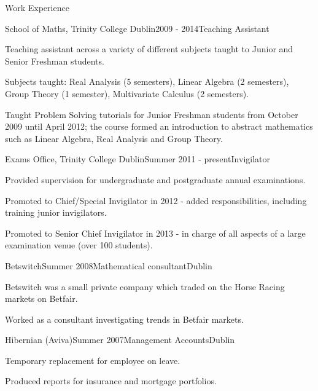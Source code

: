 \documentclass{resume} %
\begin{document}
\begin{rSection}{Work Experience}
\begin{rSubsection}{School of Maths, Trinity College Dublin}{2009 - 2014}{Teaching Assistant}{}
\item Teaching assistant across a variety of different subjects taught to Junior and Senior Freshman students.
\item Subjects taught: Real Analysis (5 semesters), Linear Algebra (2 semesters), Group Theory (1 semester), Multivariate Calculus (2 semesters).
\item Taught Problem Solving tutorials for Junior Freshman students from October 2009 until April 2012; the course formed an introduction to abstract mathematics such as Linear Algebra, Real Analysis and Group Theory.
\end{rSubsection}

\begin{rSubsection}{Exams Office, Trinity College Dublin}{Summer 2011 - present}{Invigilator}{}
\item Provided supervision for undergraduate and postgraduate annual examinations.
\item Promoted to Chief/Special Invigilator in 2012 - added responsibilities, including training junior invigilators.
\item Promoted to Senior Chief Invigilator in 2013 - in charge of all aspects of a large examination venue (over 100 students).
\end{rSubsection}


\begin{rSubsection}{Betswitch}{Summer 2008}{Mathematical consultant}{Dublin}
\item Betswitch was a small private company which traded on the Horse Racing markets on Betfair.
\item Worked as a consultant investigating trends in Betfair markets.
\end{rSubsection}




\begin{rSubsection}{Hibernian (Aviva)}{Summer 2007}{Management Accounts}{Dublin}
\item Temporary replacement for employee on leave.
\item Produced reports for insurance and mortgage portfolios.
\end{rSubsection}


\end{rSection}
\end{document}
